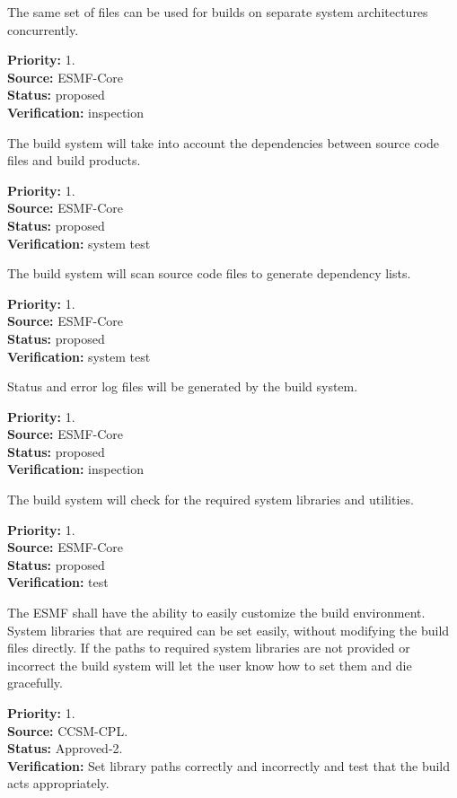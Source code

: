 The same set of files can be used for builds on separate 
system architectures concurrently.
\begin{reqlist}
{\bf Priority:} 1. \\
{\bf Source:} ESMF-Core \\
{\bf Status:} proposed \\
{\bf Verification:} inspection
\end{reqlist}

The build system will take into account the dependencies 
between source code files and build products.  
\begin{reqlist}
{\bf Priority:} 1. \\
{\bf Source:} ESMF-Core \\
{\bf Status:} proposed \\
{\bf Verification:} system test
\end{reqlist}

The build system will scan source code files to 
generate dependency lists.
\begin{reqlist}
{\bf Priority:} 1. \\
{\bf Source:} ESMF-Core \\
{\bf Status:} proposed \\
{\bf Verification:} system test
\end{reqlist}

Status and error log files will be generated by 
the build system.
\begin{reqlist}
{\bf Priority:} 1. \\
{\bf Source:} ESMF-Core \\
{\bf Status:} proposed \\
{\bf Verification:} inspection
\end{reqlist}

The build system will check for the required system 
libraries and utilities.
\begin{reqlist}
{\bf Priority:} 1. \\
{\bf Source:} ESMF-Core \\
{\bf Status:} proposed \\
{\bf Verification:} test
\end{reqlist}

The ESMF shall have the ability to easily customize the build environment. 
System libraries that are required can be set easily, without modifying 
the build files directly. If the paths to required system libraries 
are not provided or incorrect the build system will let the user know 
how to set them and die gracefully.  
\begin{reqlist}
{\bf Priority:} 1. \\
{\bf Source:} CCSM-CPL. \\
{\bf Status:} Approved-2. \\
{\bf Verification:} Set library paths correctly and incorrectly and test that 
the build acts appropriately.
\end{reqlist}
